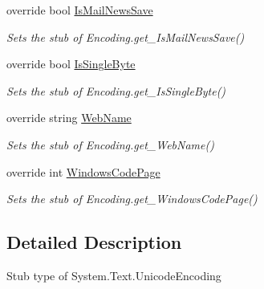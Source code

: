 \begin{DoxyCompactItemize}
override bool \hyperlink{class_system_1_1_text_1_1_fakes_1_1_stub_unicode_encoding_af1c199e5b7ab8f8988b917381584ebf8}{Is\-Mail\-News\-Save}
\begin{DoxyCompactList}\small\item\em Sets the stub of Encoding.\-get\-\_\-\-Is\-Mail\-News\-Save()\end{DoxyCompactList}\item 
override bool \hyperlink{class_system_1_1_text_1_1_fakes_1_1_stub_unicode_encoding_aea63bc7e5472320034c357d099226fea}{Is\-Single\-Byte}
\begin{DoxyCompactList}\small\item\em Sets the stub of Encoding.\-get\-\_\-\-Is\-Single\-Byte()\end{DoxyCompactList}\item 
override string \hyperlink{class_system_1_1_text_1_1_fakes_1_1_stub_unicode_encoding_a7f1a0a4901adf688cad8447116cc20c9}{Web\-Name}
\begin{DoxyCompactList}\small\item\em Sets the stub of Encoding.\-get\-\_\-\-Web\-Name()\end{DoxyCompactList}\item 
override int \hyperlink{class_system_1_1_text_1_1_fakes_1_1_stub_unicode_encoding_ad6301f6f3dcf83ca481cf4d4f7ec972b}{Windows\-Code\-Page}
\begin{DoxyCompactList}\small\item\em Sets the stub of Encoding.\-get\-\_\-\-Windows\-Code\-Page()\end{DoxyCompactList}\end{DoxyCompactItemize}


\subsection{Detailed Description}
Stub type of System.\-Text.\-Unicode\-Encoding



